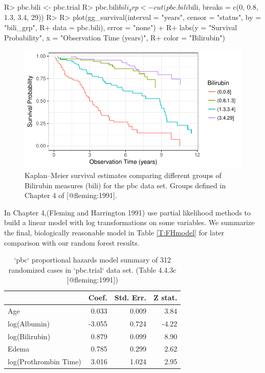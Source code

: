\documentclass[article, nojss]{jss}
\begin{document}
\begin{Schunk}
\begin{Sinput}
R> pbc.bili <- pbc.trial
R> pbc.bili$bili_grp <- cut(pbc.bili$bili, breaks = c(0, 0.8, 1.3, 3.4, 29))
R>
R> plot(gg_survival(interval = "years", censor = "status", by = "bili_grp",
R+                  data = pbc.bili), error = "none") +
R+   labs(y = "Survival Probability", x = "Observation Time (years)",
R+        color = "Bilirubin")
\end{Sinput}
\begin{figure}[!htb]

{\centering \includegraphics{rfs-gg_survival-bili-1}

}

\caption[Kaplan--Meier survival estimates comparing different groups of Bilirubin measures (bili) for the pbc data set]{Kaplan--Meier survival estimates comparing different groups of Bilirubin measures (bili) for the pbc data set. Groups defined in Chapter 4 of [@fleming:1991].}\label{fig:gg_survival-bili}
\end{figure}
\end{Schunk}

In Chapter 4,(Fleming and Harrington 1991) use partial likelihood
methods to build a linear model with log transformations on some
variables. We summarize the final, biologically reasonable model in
Table \ref{T:FHmodel} for later comparison with our random forest
results.

\begin{table}

\caption{\label{tab:xtab}`pbc` proportional hazards model summary of 312 randomized cases in `pbc.trial` data set.  (Table 4.4.3c [@fleming:1991])}
\centering
\begin{tabular}[t]{l|r|r|r}
\hline
  & Coef. & Std. Err. & Z stat.\\
\hline
Age & 0.033 & 0.009 & 3.84\\
\hline
log(Albumin) & -3.055 & 0.724 & -4.22\\
\hline
log(Bilirubin) & 0.879 & 0.099 & 8.90\\
\hline
Edema & 0.785 & 0.299 & 2.62\\
\hline
log(Prothrombin Time) & 3.016 & 1.024 & 2.95\\
\hline
\end{tabular}
\end{table}
\end{document}
